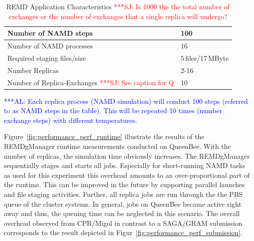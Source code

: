 \documentclass[times, 10pt, twocolumn]{article}
\newcommand{\alnote}[1]{ {\textcolor{blue} { ***AL: #1 }}}
\newcommand{\jhanote}[1]{ {\textcolor{red} { ***SJ: #1 }}}
\newcommand{\alnote}[1]{}
\newcommand{\jhanote}[1]{}
\begin{document}
\begin{table}        
    \centering
	\begin{tabular}{|p{5cm}|l|}
          \hline
          Number of NAMD steps &100\\ \hline 
          Number of NAMD processes &16\\ \hline 
          Required staging files/size &5\,files/17\,MByte\\ \hline
          Number Replicas &2-16 \\ \hline
          Number of Replica-Exchanges \jhanote{See caption for Q} &10\\ \hline
	\end{tabular}
	\caption{REMD Application Characteristics\label{tab:app_stats}
          \jhanote{Is 1000 the the total number of exchanges or the number of exchanges that a single replica will undergo?}}
          \alnote{Each replica process (NAMD simulation) will conduct 100 steps (referred to as NAMD steps in the table). This will be repeated 10 times (number exchange steps) with different temperatures.}
\end{table}   

Figure~\ref{fig:performance_perf_runtime} illustrate the results of the REMDgManager 
runtime measurements conducted on QueenBee. With the number of replicas, the simulation 
time obviously increases.  The REMDgManager sequentially stages and starts all jobs. 
Especially for short-running NAMD tasks as used for this experiment this overhead amounts 
to an over-proportional part of the runtime. This can be improved in the future by 
supporting parallel launches and file staging activities.                
Further, all replica jobs are run through the the PBS queue of the cluster systems. 
In general, jobs on QueenBee became active right away and thus, the queuing time can 
be neglected in this scenario.  The overall overhead observed from CPR/Migol in contrast to a 
SAGA/GRAM submission corresponds to the result depicted in Figur~\ref{fig:performance_perf_submission}.
\end{document}
